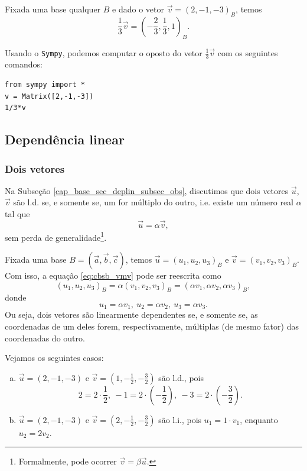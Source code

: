\begin{ex}
  Fixada uma base qualquer $B$ e dado o vetor $\vec{v} = (2, -1, -3)_B$, temos
  \begin{equation}
    \frac{1}{3}\vec{v} = \left(-\frac{2}{3}, \frac{1}{3}, 1\right)_B.
  \end{equation}

    \ifispython
  Usando o \verb+Sympy+, podemos computar o oposto do vetor $\frac{1}{3}\vec{v}$ com os seguintes comandos:
\begin{verbatim}
from sympy import *
v = Matrix([2,-1,-3])
1/3*v
\end{verbatim}
  \fi

\end{ex}

\subsection{Dependência linear}\label{cap_base_sec_base_subsec_dl}

\subsubsection{Dois vetores}

Na Subseção \ref{cap_base_sec_deplin_subsec_obs}, discutimos que dois vetores $\vec{u}$, $\vec{v}$ são l.d. se, e somente se, um for múltiplo do outro, i.e. existe um número real $\alpha$ tal que
\begin{equation}\label{eq:cbsb_vmv}
  \vec{u} = \alpha\vec{v},
\end{equation}
sem perda de generalidade\footnote{Formalmente, pode ocorrer $\vec{v} = \beta\vec{u}$.}.

Fixada uma base $B = (\vec{a}, \vec{b}, \vec{c})$, temos $\vec{u} = (u_1, u_2, u_3)_B$ e $\vec{v} = (v_1, v_2, v_3)_B$. Com isso, a equação \eqref{eq:cbsb_vmv} pode ser reescrita como
\begin{equation}
  (u_1, u_2, u_3)_B = \alpha(v_1, v_2, v_3)_B = (\alpha v_1, \alpha v_2, \alpha v_3)_B,
\end{equation}
donde
\begin{equation}
  u_1 = \alpha v_1,~u_2 = \alpha v_2,~u_3 = \alpha v_3.
\end{equation}
Ou seja, dois vetores são linearmente dependentes se, e somente se, as coordenadas de um deles forem, respectivamente, múltiplas (de mesmo fator) das coordenadas do outro.

\begin{ex}
  Vejamos os seguintes casos:
  \begin{enumerate}[a)]
  \item $\vec{u} = (2,-1,-3)$ e $\vec{v} = \left(1,-\frac{1}{2},-\frac{3}{2}\right)$ são l.d., pois
    \begin{equation}
      2 = 2\cdot \frac{1}{2},~-1 = 2\cdot\left(-\frac{1}{2}\right),~-3 = 2\cdot\left(-\frac{3}{2}\right).
    \end{equation}
  \item $\vec{u} = (2,-1,-3)$ e $\vec{v} = \left(2,-\frac{1}{2},-\frac{3}{2}\right)$ são l.i., pois $u_1 = 1\cdot v_1$, enquanto $u_2 = 2v_2$.
  \end{enumerate}
\end{ex}


